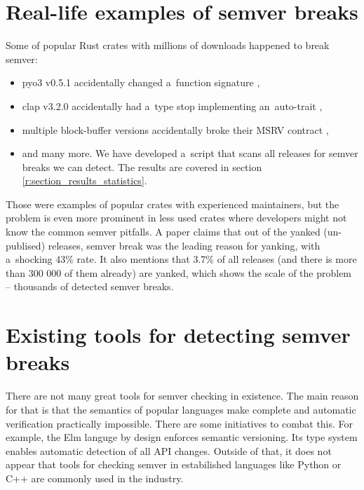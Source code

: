 \documentclass[licencjacka,en]{pracamgr}
\begin{document}
\section{Real-life examples of semver breaks} \label{r:section_real_life_semver_breaks}

Some of popular Rust crates with millions of downloads happened to break semver:
\begin{itemize}
    \item {\ttfamily pyo3 v0.5.1} accidentally changed a~function signature \cite{pyo3-issue},
    \item {\ttfamily clap v3.2.0} accidentally had a~type stop implementing an~auto-trait
		\cite{clap-issue},
    \item multiple {\ttfamily block-buffer} versions accidentally broke their MSRV contract
		\cite{block-buffer-issue},
    \item and many more. We have developed a~script that scans all releases for semver breaks we
		can detect. The results are covered in section \ref{r:section_results_statistics}.
\end{itemize}

Those were examples of popular crates with experienced maintainers, but the problem is even more
prominent in less used crates where developers might not know the common semver pitfalls. A paper
\cite{paper} claims that out of the yanked (un-publised) releases, semver break was the leading
reason for yanking, with a~shocking 43\% rate. It also mentions that 3.7\% of all releases
(and there is more than 300 000 of them already) are yanked, which shows the scale of the problem
-- thousands of detected semver breaks.

\section{Existing tools for detecting semver breaks}\label{r:section_existing_semver_tools}

There are not many great tools for semver checking in existence. The main reason for that is that
the semantics of popular languages make complete and automatic verification practically impossible.
There are some initiatives to combat this. For example, the Elm languge \cite{elm-lang} by design
enforces semantic versioning. Its type system enables automatic detection of all API changes.
Outside of that, it does not appear that tools for checking semver in estabilished languages like
Python or C++ are commonly used in the industry.
\end{document}
